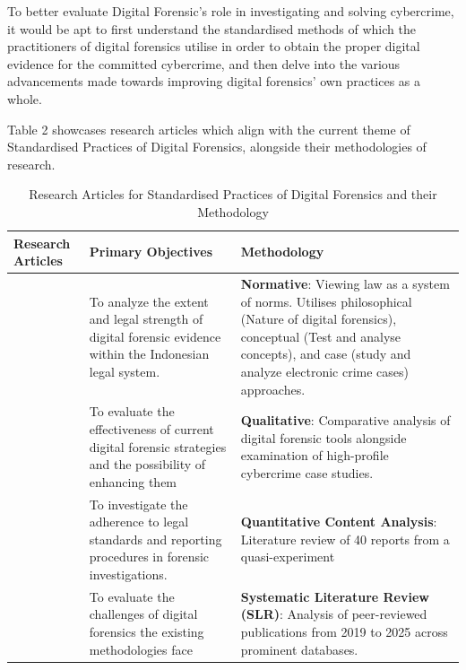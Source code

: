 \documentclass[12pt,a4paper]{article}
\begin{document}
To better evaluate Digital Forensic’s role in investigating and solving cybercrime, it would be apt to first understand the standardised methods of which the practitioners of digital forensics utilise in order to obtain the proper digital evidence for the committed cybercrime, and then delve into the various advancements made towards improving digital forensics' own practices as a whole.

Table 2 showcases research articles which align with the current theme of Standardised Practices of Digital Forensics, alongside their methodologies of research.

\begin{table}[H]
\caption{Research Articles for Standardised Practices of Digital Forensics and their Methodology}
\label{tab:inclusion-exclusion}

\fontsize{10pt}{12pt}\selectfont

\begin{tabular}{|p{4cm}|p{5cm}|p{5cm}|}
\hline
\centering\textbf{Research Articles} &
\centering\textbf{Primary Objectives} &
\centering\textbf{Methodology}
\tabularnewline
\hline

\centering \cite{ilyas2024role}  &
\centering To analyze the extent and legal strength of digital forensic evidence within the Indonesian legal system. &
\centering \textbf{Normative}: Viewing law as a system of norms. Utilises philosophical (Nature of digital forensics), conceptual (Test and analyse concepts), and case (study and analyze electronic crime cases) approaches.
\tabularnewline
\hline

\centering \cite{hassan2025}  &
\centering To evaluate the effectiveness of current digital forensic strategies and the possibility of enhancing them &
\centering \textbf{Qualitative}: Comparative analysis of digital forensic tools alongside examination of high-profile cybercrime case studies.
\tabularnewline
\hline

\centering \cite{sharma2024digital} &
\centering To investigate the adherence to legal standards and reporting procedures in forensic investigations. &
\centering \textbf{Quantitative Content Analysis}: 
Literature review of 40 reports from a quasi-experiment
\tabularnewline
\hline

\centering \cite{ARIF2025104296}  &
\centering To evaluate the challenges of digital forensics the existing methodologies face &
\centering \textbf{Systematic Literature Review (SLR)}: Analysis of peer-reviewed publications from 2019 to 2025 across prominent databases.
\tabularnewline
\hline

\end{tabular}

\end{table}
\end{document}
